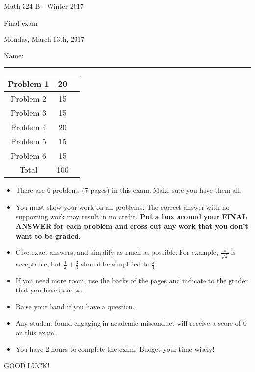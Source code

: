 \documentclass[12 pt]{report}
\begin{document}
\noindent \vfill \noindent \large

\centerline{Math 324 B  - Winter 2017}

\centerline{Final exam}

\centerline{Monday, March 13th, 2017}

\normalsize

\vfill
\medskip
Name: \rule{10cm}{1pt}

\bigskip

\vfill
\begin{center}
{\large
\begin{tabular}{||c|c|r||}
\hline Problem 1 & 20 & \hspace{10mm} \hfill \\
\hline Problem 2 & 15 & \hspace{10mm} \hfill \\
\hline Problem 3 & 15 & \hspace{10mm} \hfill \\
\hline Problem 4 & 20  & \hspace{10mm} \hfill \\
\hline Problem 5 & 15  & \hspace{10mm} \hfill \\
\hline Problem 6 & 15  & \hspace{10mm} \hfill \\
\hline Total & 100 & \hspace{10mm} \hfill \\
\hline
\end{tabular}
}
\end{center}
\vfill
\begin{itemize}
\item There are 6 problems (7 pages) in this exam. Make sure you have them all. 
\item You must show your work on all problems.  The correct answer
with no supporting work may result in no credit. \textbf{Put a box
around your FINAL ANSWER for each problem and cross out any work
that you don't want to be graded.} 
\item Give exact answers, and simplify as much as possible. 
For example, $\frac{\pi}{\sqrt{2}}$ is acceptable, but $\frac{1}{2} + \frac{3}{4}$
should be simplified to $\frac{5}{4}$.   

\item If you need more room, use the backs
of the pages and indicate to the grader that you have done so.
\item Raise your hand if you have a question.
\item Any student found engaging in academic misconduct will receive
a score of 0 on this exam.
\item You have 2 hours to complete the exam.  Budget your time wisely! \\
\end{itemize}
\vfill
\begin{center}GOOD LUCK!\end{center}
\end{document}
